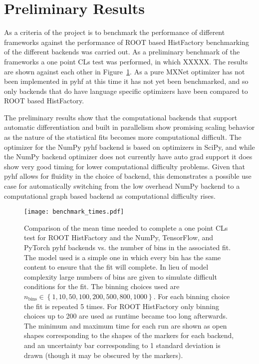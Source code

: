 \section{Preliminary Results}\label{section:results}

As a criteria of the project is to benchmark the performance of different frameworks against the performance of ROOT based HistFactory benchmarking of the different backends was carried out.
As a preliminary benchmark of the frameworks a one point CLs test was performed, in which XXXXX.
The results are shown against each other in Figure~\ref{fig:benchmark_backends}.
As a pure MXNet optimizer has not been implemented in pyhf at this time it has not yet been benchmarked, and so only backends that do have language specific optimizers have been compared to ROOT based HistFactory.

The preliminary results show that the computational backends that support automatic differentiation and built in parallelism show promising scaling behavior as the nature of the statistical fits becomes more computational difficult.
The optimizer for the NumPy pyhf backend is based on optimizers in SciPy, and while the NumPy backend optimizer does not currently have auto grad support it does show very good timing for lower computational difficulty problems.
Given that pyhf allows for fluidity in the choice of backend, this demonstrates a possible use case for automatically switching from the low overhead NumPy backend to a computational graph based backend as computational difficulty rises.

\begin{figure}
 \centering
 \texttt{[image: benchmark\_times.pdf]}
 \caption{Comparison of the mean time needed to complete a one point CLs test for ROOT HistFactory and the NumPy, TensorFlow, and PyTorch pyhf backends vs. the number of bins in the associated fit.
  The model used is a simple one in which every bin has the same content to ensure that the fit will complete.
  In lieu of model complexity large numbers of bins are given to simulate difficult conditions for the fit.
  The binning choices used are $n_{\text{bins}} \in \left\{1, 10, 50, 100, 200, 500, 800, 1000\right\}$.
  For each binning choice the fit is repeated 5 times.
  For ROOT HistFactory only binning choices up to 200 are used as runtime became too long afterwards.
  The minimum and maximum time for each run are shown as open shapes corresponding to the shapes of the markers for each backend, and an uncertainty bar corresponding to 1 standard deviation is drawn (though it may be obscured by the markers).
 }\label{fig:benchmark_backends}
\end{figure}

